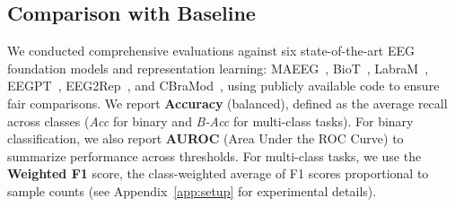 \documentclass{article} %
\begin{document}
\subsection{Comparison with Baseline}
We conducted comprehensive evaluations against six state-of-the-art EEG foundation models and representation learning: MAEEG~\citep{maeeg}, BioT~\citep{Biot}, LabraM~\citep{LaBraM}, EEGPT~\citep{EEGPT}, EEG2Rep~\citep{eeg2rep}, and CBraMod~\citep{cbramod}, using publicly available code to ensure fair comparisons. We report \textbf{Accuracy} (balanced), defined as the average recall across classes (\textit{Acc} for binary and \textit{B-Acc} for multi-class tasks). For binary classification, we also report \textbf{AUROC} (Area Under the ROC Curve) to summarize performance across thresholds. For multi-class tasks, we use the \textbf{Weighted F1} score, the class-weighted average of F1 scores proportional to sample counts (see Appendix~\ref{app:setup} for experimental details).
\end{document}
